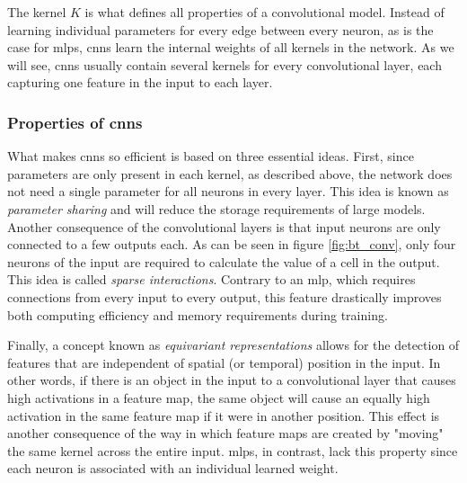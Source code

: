 The kernel $K$ is what defines all properties of a convolutional model. Instead of learning individual parameters for every edge between every neuron, as is the case for \acrshort{mlp}s, \acrshort{cnn}s learn the internal weights of all kernels in the network. As we will see, \acrshort{cnn}s usually contain several kernels for every convolutional layer, each capturing one feature in the input to each layer.

\subsubsection{Properties of \acrshort{cnn}s}

What makes \acrshort{cnn}s so efficient is based on three essential ideas. First, since parameters are only present in each kernel, as described above, the network does not need a single parameter for all neurons in every layer. This idea is known as \textit{parameter sharing} and will reduce the storage requirements of large models. Another consequence of the convolutional layers is that input neurons are only connected to a few outputs each. As can be seen in figure \ref{fig:bt_conv}, only four neurons of the input are required to calculate the value of a cell in the output. This idea is called \textit{sparse interactions}. Contrary to an \acrshort{mlp}, which requires connections from every input to every output, this feature drastically improves both computing efficiency and memory requirements during training.

Finally, a concept known as \textit{equivariant representations} allows for the detection of features that are independent of spatial (or temporal) position in the input. In other words, if there is an object in the input to a convolutional layer that causes high activations in a feature map, the same object will cause an equally high activation in the same feature map if it were in another position. This effect is another consequence of the way in which feature maps are created by "moving" the same kernel across the entire input. \acrshort{mlp}s, in contrast, lack this property since each neuron is associated with an individual learned weight. 



